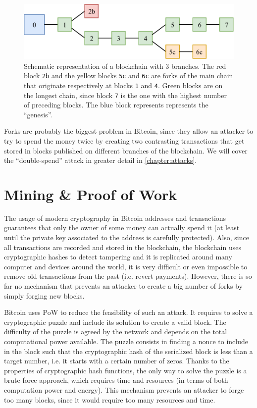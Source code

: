 \begin{figure}[ht]
	\centering
	\vspace*{0.25cm}
	\includegraphics[scale=0.9]{figures/forks}
	\vspace*{0.25cm}
	\caption[Schematic representation of a blockchain with \num{3} branches]{
		Schematic representation of a blockchain with \num{3} branches.
		The red block \texttt{2b} and the yellow blocks \texttt{5c} and \texttt{6c} are forks of the main chain that originate respectively at blocks \texttt{1} and \texttt{4}.
		Green blocks are on the longest chain, since block \texttt{7} is the one with the highest number of preceding blocks.
		The blue block represents represents the ``genesis''.
	}
	\label{fig:forks}
\end{figure}

Forks are probably the biggest problem in Bitcoin, since they allow an attacker to try to spend the money twice by creating two contrasting transactions that get stored in blocks published on different branches of the blockchain.
We will cover the ``double-spend'' attack in greater detail in \cref{chapter:attacks}.

\section{Mining \& Proof of Work}
\label{sec:mining}
The usage of modern cryptography in Bitcoin addresses and transactions guarantees that only the owner of some money can actually spend it (at least until the private key associated to the address is carefully protected).
Also, since all transactions are recorded and stored in the blockchain, the blockchain uses cryptographic hashes to detect tampering and it is replicated around many computer and devices around the world, it is very difficult or even impossible to remove old transactions from the past (i.e. revert payments).
However, there is so far no mechanism that prevents an attacker to create a big number of forks by simply forging new blocks.

\bigskip
Bitcoin uses \ac{PoW} \cite{pow_2002} to reduce the feasibility of such an attack.
It requires to solve a cryptographic puzzle and include its solution to create a valid block.
The difficulty of the puzzle is agreed by the network and depends on the total computational power available.
The puzzle consists in finding a nonce to include in the block such that the cryptographic hash of the serialized block is less than a target number, i.e. it starts with a certain number of zeros.
Thanks to the properties of cryptographic hash functions, the only way to solve the puzzle is a brute-force approach, which requires time and resources (in terms of both computation power and energy).
This mechanism prevents an attacker to forge too many blocks, since it would require too many resources and time.

